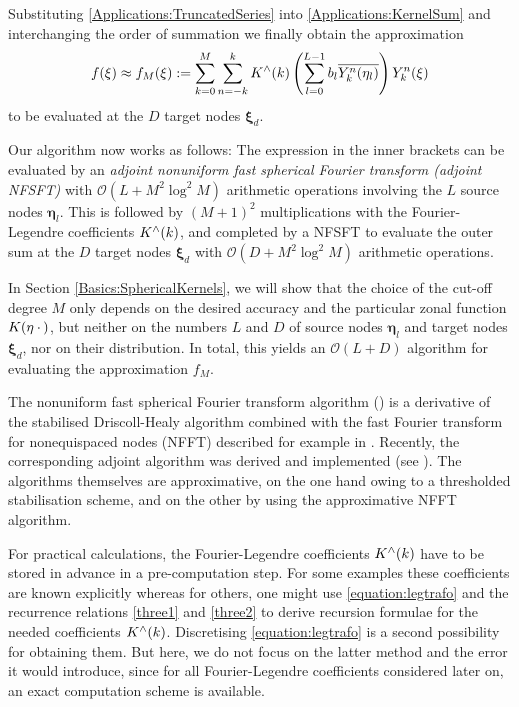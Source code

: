 \documentclass[11pt,a4paper,twoside,bibtotoc]{scrartcl}
\theoremstyle{plain}
\theoremstyle{definition}
\theoremstyle{remark}
\newcommand{\fun}[2]{\ensuremath{#1{\hspace{-0.4ex}}\left(#2\right)}}
\numberwithin{equation}{section}
\numberwithin{table}{section}
\numberwithin{figure}{section}
\begin{document}
Substituting \eqref{Applications:TruncatedSeries} into
\eqref{Applications:KernelSum} and interchanging the order of summation we
finally obtain the approximation
\[
  \fun{f}{\mathbf{\xi}} \approx \fun{f_{M}}{\mathbf{\xi}} := \sum_{k=0}^{M} \sum_{n=-k}^k \fun{K^{\wedge}}{k}
  \left(\sum_{l = 0}^{L-1} b_{l} \overline{\fun{Y_{k}^n}{\mathbf{\eta}_{l}}}\right)
  \fun{Y_{k}^n}{\mathbf{\xi}}
\]
to be evaluated at the $D$ target nodes $\mathbf{\xi}_{d}$.

Our algorithm now works as follows: The expression in the inner brackets 
can be evaluated by an \emph{adjoint nonuniform fast spherical Fourier 
transform (adjoint NFSFT)} with $\mathcal{O}(L + M^2 \log^2 M)$ arithmetic 
operations involving the $L$ source nodes $\mathbf{\eta}_{l}$. This is followed 
by $(M+1)^2$ multiplications with the Fourier-Legendre coefficients 
$\fun{K^{\wedge}}{k}$, and completed by a NFSFT to evaluate the
outer sum at the $D$ target nodes $\mathbf{\xi}_{d}$ with $\mathcal{O}\left(D + M^2 \log^2
M\right)$ arithmetic operations.

In Section \ref{Basics:SphericalKernels}, we will show that the choice 
of the cut-off degree $M$ only depends on the desired accuracy
and the particular zonal function $\fun{K}{\mathbf{\eta} \: \cdot \,}$, but neither
on the numbers $L$ and $D$ of source nodes $\mathbf{\eta}_{l}$ and target nodes 
$\mathbf{\xi}_{d}$, nor on their distribution.
In total, this yields an $\mathcal{O}\left(L + D\right)$ algorithm for evaluating the 
approximation $f_{M}$.

The nonuniform fast spherical Fourier transform algorithm (\cite{kupo02}) is 
a derivative of the stabilised Driscoll-Healy algorithm \cite{drhe,postta97}
combined with the fast Fourier transform for nonequispaced nodes (NFFT)
described for example in \cite{postta01}. Recently, the corresponding adjoint 
algorithm was derived and implemented (see \cite{keiner05}). The algorithms 
themselves are approximative, on the one hand owing to a thresholded 
stabilisation scheme, and on the other by using the approximative
NFFT algorithm.

For practical calculations, the Fourier-Legendre coefficients 
$\fun{K^{\wedge}}{k}$ have to be stored in advance in a pre-computation step. 
For some examples these coefficients are known explicitly whereas for others, one might use \eqref{equation:legtrafo}
and the recurrence relations \eqref{three1} and \eqref{three2} to derive
recursion formulae for the needed coefficients $\fun{K^{\wedge}}{k}$.
Discretising \eqref{equation:legtrafo} is a second possibility for obtaining them.
But here, we do not focus on the latter method and the error it would introduce, since for all Fourier-Legendre coefficients considered later on, an exact computation scheme is available.
\end{document}
